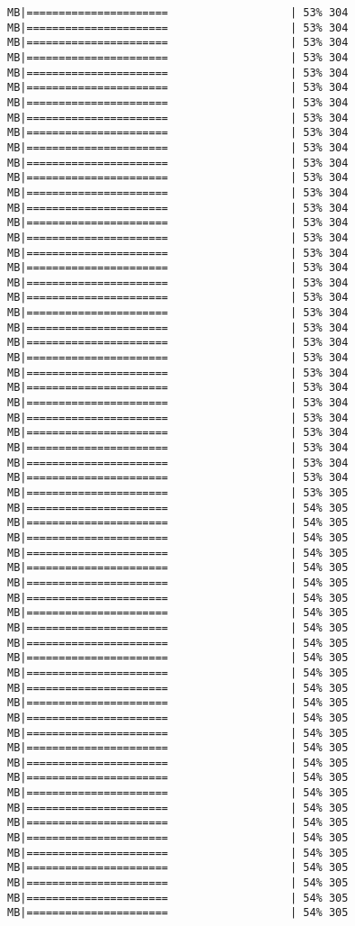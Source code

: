 \documentclass[
]{article}
\begin{document}
\begin{verbatim}
MB|======================                   | 53% 304 MB|======================                   | 53% 304 MB|======================                   | 53% 304 MB|======================                   | 53% 304 MB|======================                   | 53% 304 MB|======================                   | 53% 304 MB|======================                   | 53% 304 MB|======================                   | 53% 304 MB|======================                   | 53% 304 MB|======================                   | 53% 304 MB|======================                   | 53% 304 MB|======================                   | 53% 304 MB|======================                   | 53% 304 MB|======================                   | 53% 304 MB|======================                   | 53% 304 MB|======================                   | 53% 304 MB|======================                   | 53% 304 MB|======================                   | 53% 304 MB|======================                   | 53% 304 MB|======================                   | 53% 304 MB|======================                   | 53% 304 MB|======================                   | 53% 304 MB|======================                   | 53% 304 MB|======================                   | 53% 304 MB|======================                   | 53% 304 MB|======================                   | 53% 304 MB|======================                   | 53% 304 MB|======================                   | 53% 304 MB|======================                   | 53% 304 MB|======================                   | 53% 304 MB|======================                   | 53% 304 MB|======================                   | 53% 304 MB|======================                   | 53% 305 MB|======================                   | 54% 305 MB|======================                   | 54% 305 MB|======================                   | 54% 305 MB|======================                   | 54% 305 MB|======================                   | 54% 305 MB|======================                   | 54% 305 MB|======================                   | 54% 305 MB|======================                   | 54% 305 MB|======================                   | 54% 305 MB|======================                   | 54% 305 MB|======================                   | 54% 305 MB|======================                   | 54% 305 MB|======================                   | 54% 305 MB|======================                   | 54% 305 MB|======================                   | 54% 305 MB|======================                   | 54% 305 MB|======================                   | 54% 305 MB|======================                   | 54% 305 MB|======================                   | 54% 305 MB|======================                   | 54% 305 MB|======================                   | 54% 305 MB|======================                   | 54% 305 MB|======================                   | 54% 305 MB|======================                   | 54% 305 MB|======================                   | 54% 305 MB|======================                   | 54% 305 MB|======================                   | 54% 305 MB|======================                   | 54% 305 
\end{verbatim}
\end{document}
